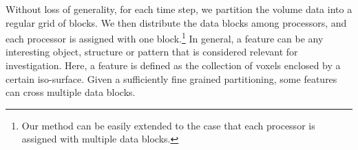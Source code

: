 %
%
%

% 

Without loss of generality, for each time step, we partition the volume data into a regular grid of blocks. We then distribute the data blocks among processors, and each processor is assigned with one block.\footnote{Our method can be easily extended to the case that each processor is assigned with multiple data blocks.} In general, a feature can be any interesting object, structure or pattern that is considered relevant for investigation. Here, a feature is defined as the collection of voxels enclosed by a certain iso-surface. Given a sufficiently fine grained partitioning, some features can cross multiple data blocks.

